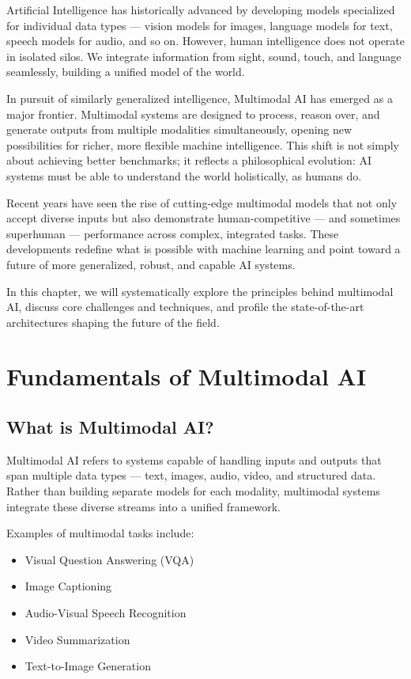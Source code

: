 \documentclass[openany]{book}
\begin{document}
Artificial Intelligence has historically advanced by developing models 
specialized for individual data types — vision models for images, language 
models for text, speech models for audio, and so on. However, human intelligence 
does not operate in isolated silos. We integrate information from sight, sound, 
touch, and language seamlessly, building a unified model of the world.

In pursuit of similarly generalized intelligence, Multimodal AI has emerged as a 
major frontier. Multimodal systems are designed to process, reason over, and 
generate outputs from multiple modalities simultaneously, opening new 
possibilities for richer, more flexible machine intelligence. This shift is not 
simply about achieving better benchmarks; it reflects a philosophical evolution: 
AI systems must be able to understand the world holistically, as humans do.

Recent years have seen the rise of cutting-edge multimodal models that not only 
accept diverse inputs but also demonstrate human-competitive — and sometimes 
superhuman — performance across complex, integrated tasks. These developments 
redefine what is possible with machine learning and point toward a future of 
more generalized, robust, and capable AI systems.

In this chapter, we will systematically explore the principles behind multimodal 
AI, discuss core challenges and techniques, and profile the state-of-the-art 
architectures shaping the future of the field.

\section{Fundamentals of Multimodal AI}

\subsection{What is Multimodal AI?}
Multimodal AI refers to systems capable of handling inputs and outputs that span 
multiple data types — text, images, audio, video, and structured data. Rather 
than building separate models for each modality, multimodal systems integrate 
these diverse streams into a unified framework.

Examples of multimodal tasks include:
\begin{itemize}
    \item Visual Question Answering (VQA)
    \item Image Captioning
    \item Audio-Visual Speech Recognition
    \item Video Summarization
    \item Text-to-Image Generation
\end{itemize}
\end{document}
